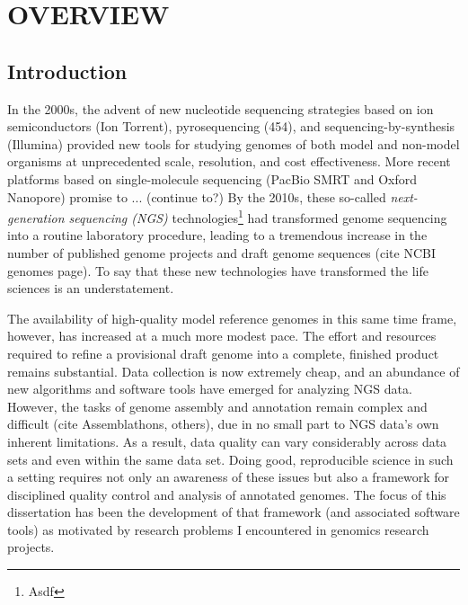 \chapter{OVERVIEW}

\section{Introduction}

In the 2000s, the advent of new nucleotide sequencing strategies based on ion semiconductors (Ion Torrent), pyrosequencing (454), and sequencing-by-synthesis (Illumina) provided new tools for studying genomes of both model and non-model organisms at unprecedented scale, resolution, and cost effectiveness.
More recent platforms based on single-molecule sequencing (PacBio SMRT and Oxford Nanopore) promise to ... (continue to?)
By the 2010s, these so-called \textit{next-generation sequencing (NGS)} technologies\footnote{Asdf} had transformed genome sequencing into a routine laboratory procedure, leading to a tremendous increase in the number of published genome projects and draft genome sequences (cite NCBI genomes page).
To say that these new technologies have transformed the life sciences is an understatement.

The availability of high-quality model reference genomes in this same time frame, however, has increased at a much more modest pace.
The effort and resources required to refine a provisional draft genome into a complete, finished product remains substantial.
Data collection is now extremely cheap, and an abundance of new algorithms and software tools have emerged for analyzing NGS data.
However, the tasks of genome assembly and annotation remain complex and difficult (cite Assemblathons, others), due in no small part to NGS data's own inherent limitations.
As a result, data quality can vary considerably across data sets and even within the same data set.
Doing good, reproducible science in such a setting requires not only an awareness of these issues but also a framework for disciplined quality control and analysis of annotated genomes.
The focus of this dissertation has been the development of that framework (and associated software tools) as motivated by research problems I encountered in genomics research projects.

